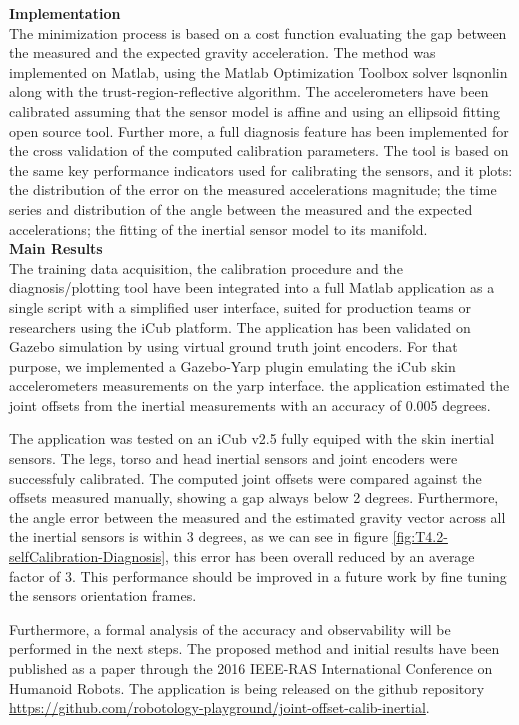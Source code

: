 \textbf{Implementation}\\

The minimization process is based on a cost function evaluating the gap between the measured and the expected gravity acceleration. The method was implemented on Matlab, using the Matlab Optimization Toolbox solver lsqnonlin along with the trust-region-reflective algorithm. The accelerometers  have been calibrated assuming that the sensor model is affine and using an ellipsoid fitting open source tool. Further more, a full diagnosis feature has been implemented for the cross validation of the computed calibration parameters. The tool is based on the same key performance indicators used for calibrating the sensors, and it plots: the distribution of the error on the measured accelerations magnitude; the time series and distribution of the angle between the measured and the expected accelerations; the fitting of the inertial sensor model to its manifold.\\

\textbf{Main Results}\\

The training data acquisition, the calibration procedure and the diagnosis/plotting tool have been integrated into a full Matlab application as a single script with a simplified user interface, suited for production teams or researchers using the iCub platform. The application has been validated on Gazebo simulation by using virtual ground truth joint encoders. For that purpose, we implemented a Gazebo-Yarp plugin emulating the iCub skin accelerometers measurements on the yarp interface. the application estimated the joint offsets from the inertial measurements with an accuracy of 0.005 degrees.

The application was tested on an iCub v2.5 fully equiped with the skin inertial sensors. The legs, torso and head inertial sensors and joint encoders were successfuly calibrated. The computed joint offsets were compared against the offsets measured manually, showing a gap always below 2 degrees. Furthermore, the angle error between the measured and the estimated gravity vector across all the inertial sensors is within 3 degrees, as we can see in figure \ref{fig:T4.2-selfCalibration-Diagnosis}, this error has been overall reduced by an average factor of 3. This performance should be improved in a future work by fine tuning the sensors orientation frames.

Furthermore, a formal analysis of the accuracy and observability will be performed in the next steps. The proposed method and initial results have been published as a paper \cite{GuedelhaSelfCalibJointOffsets2016} through the 2016 IEEE-RAS International Conference on Humanoid Robots. The application is being released on the github repository \url{https://github.com/robotology-playground/joint-offset-calib-inertial}.\\


